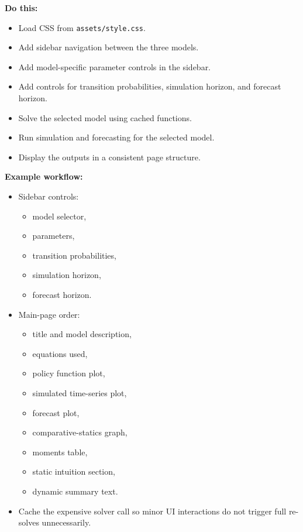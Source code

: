 \documentclass[11pt]{article}
\begin{document}
\textbf{Do this:}
\begin{itemize}
    \item Load CSS from \verb|assets/style.css|.
    \item Add sidebar navigation between the three models.
    \item Add model-specific parameter controls in the sidebar.
    \item Add controls for transition probabilities, simulation horizon, and forecast horizon.
    \item Solve the selected model using cached functions.
    \item Run simulation and forecasting for the selected model.
    \item Display the outputs in a consistent page structure.
\end{itemize}

\textbf{Example workflow:}
\begin{itemize}
    \item Sidebar controls:
    \begin{itemize}
        \item model selector,
        \item parameters,
        \item transition probabilities,
        \item simulation horizon,
        \item forecast horizon.
    \end{itemize}
    \item Main-page order:
    \begin{itemize}
        \item title and model description,
        \item equations used,
        \item policy function plot,
        \item simulated time-series plot,
        \item forecast plot,
        \item comparative-statics graph,
        \item moments table,
        \item static intuition section,
        \item dynamic summary text.
    \end{itemize}
    \item Cache the expensive solver call so minor UI interactions do not trigger full re-solves unnecessarily.
\end{itemize}
\end{document}
